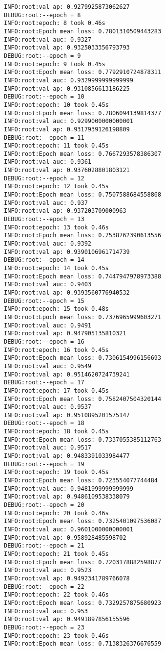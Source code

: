 \documentclass[11pt]{article}
\begin{document}
\begin{verbatim}
INFO:root:val ap: 0.9279925873062627
DEBUG:root:--epoch = 8
INFO:root:epoch: 8 took 0.46s
INFO:root:Epoch mean loss: 0.7801310509443283
INFO:root:val auc: 0.9327
INFO:root:val ap: 0.9325033356793793
DEBUG:root:--epoch = 9
INFO:root:epoch: 9 took 0.45s
INFO:root:Epoch mean loss: 0.7792910724878311
INFO:root:val auc: 0.9329999999999999
INFO:root:val ap: 0.9310856613186225
DEBUG:root:--epoch = 10
INFO:root:epoch: 10 took 0.45s
INFO:root:Epoch mean loss: 0.7806094139814377
INFO:root:val auc: 0.9299000000000001
INFO:root:val ap: 0.9317939126198809
DEBUG:root:--epoch = 11
INFO:root:epoch: 11 took 0.45s
INFO:root:Epoch mean loss: 0.7667293578386307
INFO:root:val auc: 0.9361
INFO:root:val ap: 0.9376028801803121
DEBUG:root:--epoch = 12
INFO:root:epoch: 12 took 0.45s
INFO:root:Epoch mean loss: 0.7507588684558868
INFO:root:val auc: 0.937
INFO:root:val ap: 0.937203709000963
DEBUG:root:--epoch = 13
INFO:root:epoch: 13 took 0.46s
INFO:root:Epoch mean loss: 0.7538762390613556
INFO:root:val auc: 0.9392
INFO:root:val ap: 0.9390106961714739
DEBUG:root:--epoch = 14
INFO:root:epoch: 14 took 0.45s
INFO:root:Epoch mean loss: 0.7447947978973388
INFO:root:val auc: 0.9403
INFO:root:val ap: 0.9393560776940532
DEBUG:root:--epoch = 15
INFO:root:epoch: 15 took 0.48s
INFO:root:Epoch mean loss: 0.7376965999603271
INFO:root:val auc: 0.9491
INFO:root:val ap: 0.947905135810321
DEBUG:root:--epoch = 16
INFO:root:epoch: 16 took 0.45s
INFO:root:Epoch mean loss: 0.7306154996156693
INFO:root:val auc: 0.9549
INFO:root:val ap: 0.9514620724739241
DEBUG:root:--epoch = 17
INFO:root:epoch: 17 took 0.45s
INFO:root:Epoch mean loss: 0.7582407504320144
INFO:root:val auc: 0.9537
INFO:root:val ap: 0.9510895201575147
DEBUG:root:--epoch = 18
INFO:root:epoch: 18 took 0.45s
INFO:root:Epoch mean loss: 0.7337055385112763
INFO:root:val auc: 0.9517
INFO:root:val ap: 0.9483391033984477
DEBUG:root:--epoch = 19
INFO:root:epoch: 19 took 0.45s
INFO:root:Epoch mean loss: 0.723554077744484
INFO:root:val auc: 0.9481999999999999
INFO:root:val ap: 0.9486109538338079
DEBUG:root:--epoch = 20
INFO:root:epoch: 20 took 0.46s
INFO:root:Epoch mean loss: 0.7325401097536087
INFO:root:val auc: 0.9601000000000001
INFO:root:val ap: 0.958928485598702
DEBUG:root:--epoch = 21
INFO:root:epoch: 21 took 0.45s
INFO:root:Epoch mean loss: 0.7203178882598877
INFO:root:val auc: 0.9523
INFO:root:val ap: 0.9492341789766078
DEBUG:root:--epoch = 22
INFO:root:epoch: 22 took 0.46s
INFO:root:Epoch mean loss: 0.7329257875680923
INFO:root:val auc: 0.953
INFO:root:val ap: 0.9491897856155596
DEBUG:root:--epoch = 23
INFO:root:epoch: 23 took 0.46s
INFO:root:Epoch mean loss: 0.7138326376676559

\end{verbatim}
\end{document}
